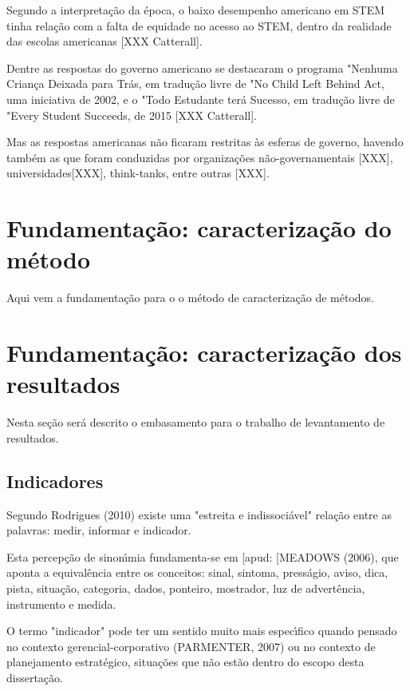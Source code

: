 \documentclass[
12pt,		%
openright,	%
twoside,  %
a4paper,			%
chapter=TITLE,		%
english,			%
french,				%
spanish,			%
brazil				%
]{USPSC-classe/USPSC}
\begin{document}
Segundo a interpreta\c{c}\~ao da \'epoca, o baixo desempenho americano em STEM tinha rela\c{c}\~ao com a falta de equidade no acesso ao STEM, dentro da realidade das escolas americanas [XXX Catterall].


Dentre as respostas do governo americano se destacaram o programa "Nenhuma Crian\c{c}a Deixada para Tr\'as, em tradu\c{c}\~ao livre de "No Child Left Behind Act, uma iniciativa de 2002, e o "Todo Estudante ter\'a Sucesso, em tradu\c{c}\~ao livre de "Every Student Succeeds, de 2015 [XXX Catterall].


Mas as respostas americanas n\~ao ficaram restritas \`as esferas de governo, havendo tamb\'em as que foram conduzidas por organiza\c{c}\~oes n\~ao-governamentais [XXX], universidades[XXX], think-tanks, entre outras [XXX].


\section[Fundamenta\c{c}\~ao: caracteriza\c{c}\~ao do m\'etodo]{Fundamenta\c{c}\~ao: caracteriza\c{c}\~ao do m\'etodo}\label{Fundamenta\c{c}\~ao: caracteriza\c{c}\~ao do m\'etodo}
Aqui vem a fundamenta\c{c}\~ao para o o m\'etodo de caracteriza\c{c}\~ao de m\'etodos.


\section[Fundamenta\c{c}\~ao: caracteriza\c{c}\~ao dos resultados]{Fundamenta\c{c}\~ao: caracteriza\c{c}\~ao dos resultados}\label{Fundamenta\c{c}\~ao: caracteriza\c{c}\~ao dos resultados}
Nesta se\c{c}\~ao ser\'a descrito o embasamento para o trabalho de levantamento de resultados.


\subsection[Indicadores]{Indicadores}\label{Indicadores}
Segundo  Rodrigues (2010)  existe uma "estreita e indissoci\'avel" rela\c{c}\~ao entre as palavras: medir, informar e indicador.


Esta percep\c{c}\~ao de sinon\'{\i}mia fundamenta-se em [apud: [MEADOWS (2006), que aponta a equival\^encia entre os conceitos: sinal, sintoma, press\'agio, aviso, dica, pista, situa\c{c}\~ao, categoria, dados, ponteiro, mostrador, luz de advert\^encia, instrumento e medida.


O termo "indicador" pode ter um sentido muito mais espec\'{\i}fico quando pensado no contexto gerencial-corporativo (PARMENTER, 2007) ou no contexto de planejamento estrat\'egico, situa\c{c}\~oes que n\~ao est\~ao dentro do escopo desta disserta\c{c}\~ao.
\end{document}
